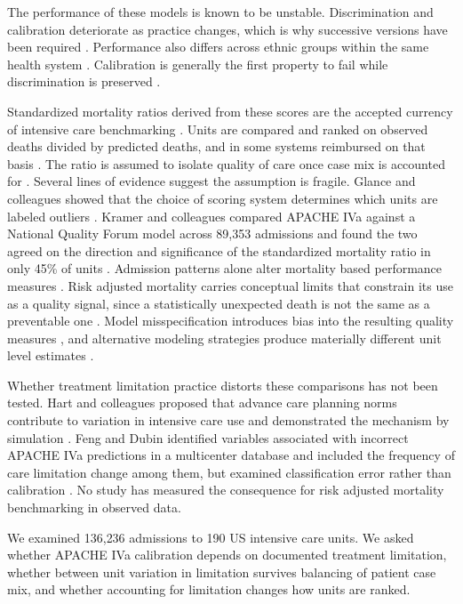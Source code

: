 \documentclass[12pt,a4paper]{article}
\begin{document}
The performance of these models is known to be unstable. Discrimination and
calibration deteriorate as practice changes, which is why successive versions
have been required \cite{ref18,ref19}. Performance also differs across ethnic groups within the same health
system \cite{ref20}. Calibration is generally the first property to fail while
discrimination is preserved \cite{ref18}.

Standardized mortality ratios derived from these scores are the accepted currency
of intensive care benchmarking \cite{ref21}. Units are compared and ranked on
observed deaths divided by predicted deaths, and in some systems reimbursed on
that basis \cite{ref21}. The ratio is assumed to isolate quality of care
once case mix is accounted for \cite{ref21}. Several lines of evidence suggest
the assumption is fragile. Glance and colleagues showed that the choice of
scoring system determines which units are labeled outliers \cite{ref21}. Kramer
and colleagues compared APACHE IVa against a National Quality Forum model across
89{,}353 admissions and found the two agreed on the direction and significance of
the standardized mortality ratio in only 45\% of units \cite{ref22}. Admission
patterns alone alter mortality based performance measures \cite{ref23}. Risk
adjusted mortality carries conceptual limits that constrain its use as a quality
signal, since a statistically unexpected death is not the same as a preventable
one \cite{ref24}. Model misspecification introduces bias into the resulting
quality measures \cite{ref25}, and alternative modeling strategies produce
materially different unit level estimates \cite{ref26,ref27}.

Whether treatment limitation practice distorts these comparisons has not been
tested. Hart and colleagues proposed that advance care planning norms contribute
to variation in intensive care use and demonstrated the mechanism by simulation
\cite{ref28}. Feng and Dubin identified variables associated with incorrect
APACHE IVa predictions in a multicenter database and included the frequency of
care limitation change among them, but examined classification error rather than
calibration \cite{ref29}. No study has measured the consequence for risk adjusted
mortality benchmarking in observed data.

We examined 136{,}236 admissions to 190 US intensive care units. We asked whether
APACHE IVa calibration depends on documented treatment limitation, whether
between unit variation in limitation survives balancing of patient case mix, and
whether accounting for limitation changes how units are ranked.
\end{document}
